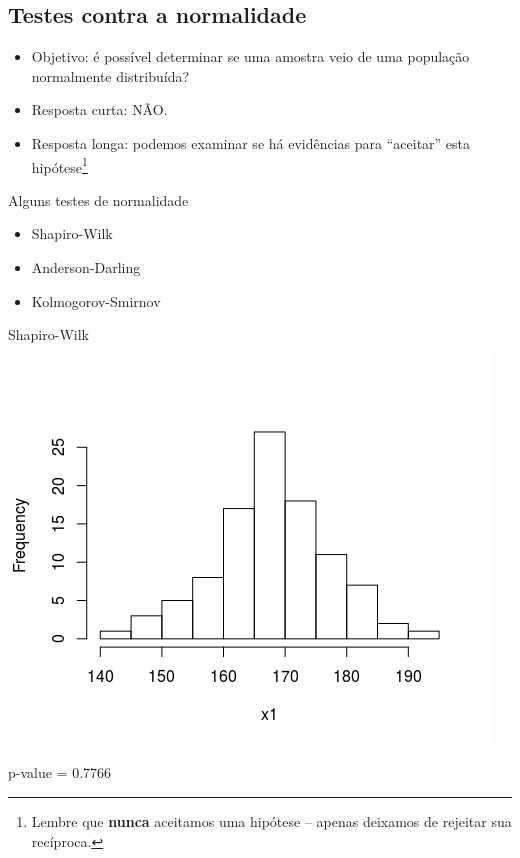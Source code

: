 \documentclass{beamer}
\begin{document}
\subsection[Normalidade]{Testes contra a normalidade}

\begin{frame}
  \begin{itemize}
  \item Objetivo: é possível \alert{determinar} se uma amostra veio de uma população normalmente distribuída?
  \item<2-> Resposta curta: \alert<3->{NÃO}.
  \item<4-> Resposta longa: podemos examinar se há evidências para ``aceitar'' esta hipótese\footnote{Lembre que {\bf nunca} aceitamos uma hipótese -- apenas deixamos de rejeitar sua recíproca.}
  \end{itemize}
\end{frame}

\begin{frame}{Alguns testes de normalidade}
  \begin{itemize}
  \item<1-> \alert<2>{Shapiro-Wilk}
  \item<1-> Anderson-Darling
  \item<1-> Kolmogorov-Smirnov
  \end{itemize}
\end{frame}

\begin{frame}{Shapiro-Wilk}
  \centering
  \includegraphics[width=.8\textwidth]{Cap37-38/normal1-h}

  p-value = 0.7766
\end{frame}
\end{document}
